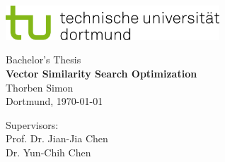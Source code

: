 \begin{titlepage}
    \sffamily
    \vspace*{-2cm}
    \begin{minipage}{12.5cm}
        \includegraphics[width=8cm]{bilder/tud_logo_rgb}
    \end{minipage}

    \vspace*{3.5cm}

    \begin{center}
        \begin{minipage}{9cm}
            \large
            \begin{center}
                {\Large Bachelor's Thesis} \\
                \vspace*{1cm}
                {\LARGE\textbf{Vector Similarity Search Optimization}} \\
                \vspace*{1cm}
                Thorben Simon\\
                Dortmund, \today
            \end{center}
        \end{minipage}
    \end{center}
    \normalsize
    \vspace*{7cm}



    \begin{minipage}[b]{5cm}
        \small
        \raggedright
        Supervisors:\\
        Prof. Dr. Jian-Jia Chen\\
        Dr. Yun-Chih Chen\\
    \end{minipage}


\end{titlepage}
